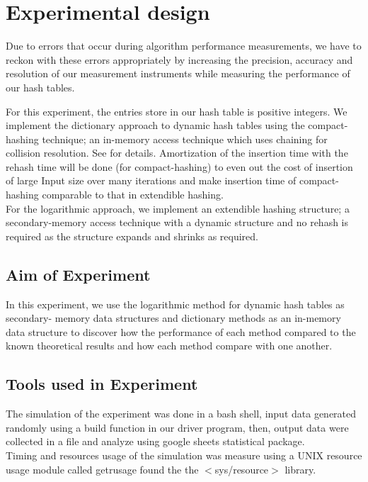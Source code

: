 \documentclass[a4paper,12pt, openany]{book}
\begin{document}
\section{Experimental design}
Due to errors that occur during algorithm performance measurements, we have to reckon with these errors appropriately by increasing the precision, accuracy and resolution of our measurement instruments while measuring the performance of our hash tables.

For this experiment, the entries store in our hash table is positive integers. We implement the dictionary approach to dynamic hash tables using the compact-hashing technique; an in-memory access technique which uses chaining for collision resolution.  See \cite{10.1007/11575832_11} for details.  Amortization of the insertion time with the rehash time will be done (for compact-hashing) to even out the cost of insertion of large Input size over many iterations and make insertion time of compact-hashing comparable to that in extendible hashing.\\
For the logarithmic approach, we implement an extendible hashing structure; a secondary-memory access technique with a  dynamic structure and no rehash is required as the structure expands and shrinks as required. 
\subsection{Aim of Experiment}
In this experiment, we use the logarithmic method for dynamic hash tables as secondary-
memory data structures and dictionary methods as an in-memory data structure to discover how the performance of each method compared to the known theoretical results and how each method compare with one another.


\subsection{Tools used in Experiment} 
The simulation of the experiment was done in a bash shell, input data generated randomly using a build function in our driver program, then, output data were collected in a file and analyze using google sheets statistical package. \\
Timing and resources usage of the simulation was measure using a UNIX resource usage module called getrusage found the the $<$sys/resource$>$ library.
\end{document}
